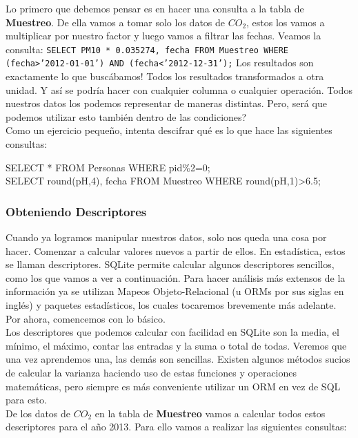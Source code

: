 \documentclass[10pt,letterpaper]{article}
\newcommand{\inlinecode}[1]{
\colorbox{light-gray}{\texttt{#1}}
}
\newenvironment{Code}
{
\begin{lrbox}{\selvestebox}%
\begin{minipage}{\dimexpr\columnwidth-2\fboxsep\relax}
\fontfamily{\ttdefault}\selectfont
}
{\end{minipage}\end{lrbox}%
\begin{center}
\colorbox{light-gray}{\usebox{\selvestebox}}
\end{center}
}
\begin{document}
Lo primero que debemos pensar es en hacer una consulta a la tabla de \textbf{Muestreo}. De ella vamos a tomar solo los datos de $CO_2$, estos los vamos a multiplicar por nuestro factor y luego vamos a filtrar las fechas. Veamos la consulta: \inlinecode{SELECT PM10 * 0.035274, fecha FROM Muestreo WHERE (fecha>'2012-01-01') AND (fecha<'2012-12-31');} Los resultados son exactamente lo que busc\'abamos! Todos los resultados transformados a otra unidad. Y as\'i se podr\'ia hacer con cualquier columna o cualquier operaci\'on. Todos nuestros datos los podemos representar de maneras distintas. Pero, ser\'a que podemos utilizar esto tambi\'en dentro de las condiciones?\\

Como un ejercicio peque\~no, intenta descifrar qu\'e es lo que hace las siguientes consultas:
\begin{Code}
SELECT * FROM Personas WHERE pid\%2=0;\\
SELECT round(pH,4), fecha FROM Muestreo WHERE round(pH,1)>6.5;
\end{Code}

\subsubsection{Obteniendo Descriptores}
Cuando ya logramos manipular nuestros datos, solo nos queda una cosa por hacer. Comenzar a calcular valores nuevos a partir de ellos. En estad\'istica, estos se llaman descriptores. SQLite permite calcular algunos descriptores sencillos, como los que vamos a ver a continuaci\'on. Para hacer an\'alisis m\'as extensos de la informaci\'on ya se utilizan Mapeos Objeto-Relacional (u ORMs por sus siglas en ingl\'es) y paquetes estad\'isticos, los cuales tocaremos brevemente m\'as adelante. Por ahora, comencemos con lo b\'asico.\\

Los descriptores que podemos calcular con facilidad en SQLite son la media, el m\'inimo, el m\'aximo, contar las entradas y la suma o total de todas. Veremos que una vez aprendemos una, las dem\'as son sencillas. Existen algunos m\'etodos sucios de calcular la varianza haciendo uso de estas funciones y operaciones matem\'aticas, pero siempre es m\'as conveniente utilizar un ORM en vez de SQL para esto.\\

De los datos de $CO_2$ en la tabla de \textbf{Muestreo} vamos a calcular todos estos descriptores para el a\~no 2013. Para ello vamos a realizar las siguientes consultas:
\end{document}
